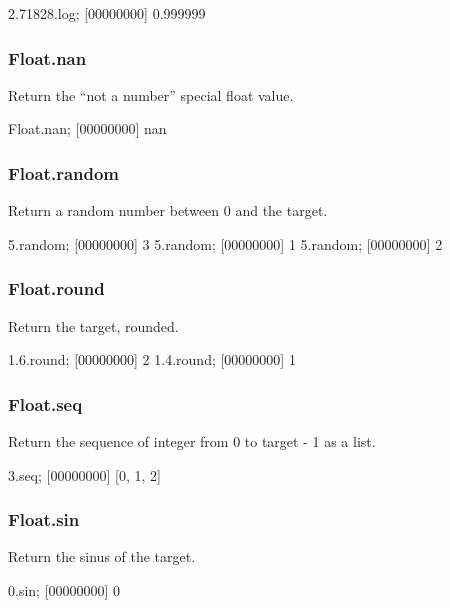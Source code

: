 \begin{urbiscript}
2.71828.log;
[00000000] 0.999999
\end{urbiscript}

\subsubsection{Float.nan}

Return the ``not a number'' special float value.

\begin{urbiscript}
Float.nan;
[00000000] nan
\end{urbiscript}

\subsubsection{Float.random}

Return a random number between 0 and the target.

\begin{urbiscript}
5.random;
[00000000] 3
5.random;
[00000000] 1
5.random;
[00000000] 2
\end{urbiscript}

\subsubsection{Float.round}

Return the target, rounded.

\begin{urbiscript}
1.6.round;
[00000000] 2
1.4.round;
[00000000] 1
\end{urbiscript}

\subsubsection{Float.seq}

Return the sequence of integer from 0 to target - 1 as a list.

\begin{urbiscript}
3.seq;
[00000000] [0, 1, 2]
\end{urbiscript}

\subsubsection{Float.sin}

Return the sinus of the target.

\begin{urbiscript}
0.sin;
[00000000] 0
\end{urbiscript}


